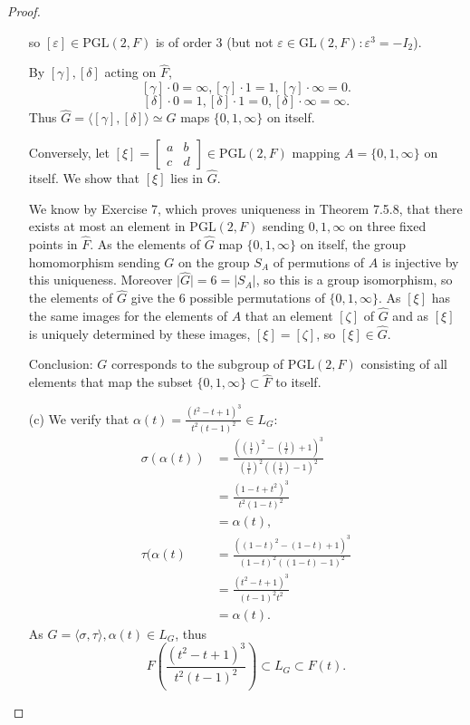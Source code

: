 \documentclass[11pt,a4paper]{article}
\begin{document}
\begin{proof}
\begin{enumerate}
so $[\varepsilon] \in  \mathrm{PGL}(2,F) $ is of order 3 (but not  $\varepsilon \in  \mathrm{GL}(2,F): \varepsilon^3 = -I_2$).

By  $[\gamma],[\delta]$ acting on $\hat{F}$, $$[\gamma] \cdot 0 = \infty,  [\gamma] \cdot  1 = 1, [\gamma] \cdot \infty = 0.$$
$$[\delta] \cdot 0 = 1,  [\delta] \cdot  1 = 0, [\delta] \cdot \infty = \infty.$$
Thus $\hat{G} = \langle[\gamma],  [\delta] \rangle  \simeq G$ maps $\{0,1,\infty\}$ on itself. 

Conversely, let $[\xi] = 
\left[
\begin{array}{ccc}
a &  b    \\
c  &   d  
\end{array}
\right]
 \in \mathrm{PGL}(2,F)$ mapping $A = \{0,1,\infty\}$ on itself. We show that $[\xi]$ lies in $\hat{G}$.

We know by Exercise 7, which proves uniqueness in Theorem 7.5.8, that there exists at most an element in $\mathrm{PGL}(2,F)$ sending $0,1,\infty$ on three fixed points in $\hat{F}$.
As the elements of $\hat{G}$ map $\{0,1,\infty\}$ on itself, the group homomorphism sending $G$ on the group $S_A$ of permutions of $A$ is injective by this uniqueness. Moreover $\vert \hat{G} \vert =6 = \vert S_A \vert$, so this is a group isomorphism, so the elements of $\hat{G}$ give the 6 possible permutations of $\{0,1,\infty\}$. As $[\xi]$ has the same images for the elements of $A$ that an element $[\zeta]$ of $\hat{G}$ and as $[\xi]$ is uniquely determined by these images, $[\xi] = [\zeta]$, so $[\xi] \in \hat{G}$.

Conclusion: $G$ corresponds to the subgroup of $\mathrm{PGL}(2,F)$ consisting of all elements that map the subset $\{0,1,\infty\} \subset \hat{F}$ to itself.


\item[(c)]
We verify that $\alpha(t) = \frac{(t^2-t+1)^3}{t^2(t-1)^2} \in L_G$:
\begin{align*}
\sigma(\alpha(t)) &= \frac{((\frac{1}{t})^2-(\frac{1}{t})+1)^3}{(\frac{1}{t})^2((\frac{1}{t})-1)^2}\\
&=\frac{(1 -t +t^2)^3}{t^2(1-t)^2}\\
&=\alpha(t),\\
\tau(\alpha(t) &=  \frac{((1-t)^2-(1-t)+1)^3}{(1-t)^2((1-t)-1)^2} \\
&=\frac{(t^2-t+1)^3}{(t-1)^2 t^2}\\
&=\alpha(t).
\end{align*}
As $G = \langle \sigma,\tau\rangle, \alpha(t) \in L_G$, thus
$$F\left(\frac{(t^2-t+1)^3}{t^2(t-1)^2} \right) \subset L_G \subset F(t).$$


\end{enumerate}
\end{proof}
\end{document}
